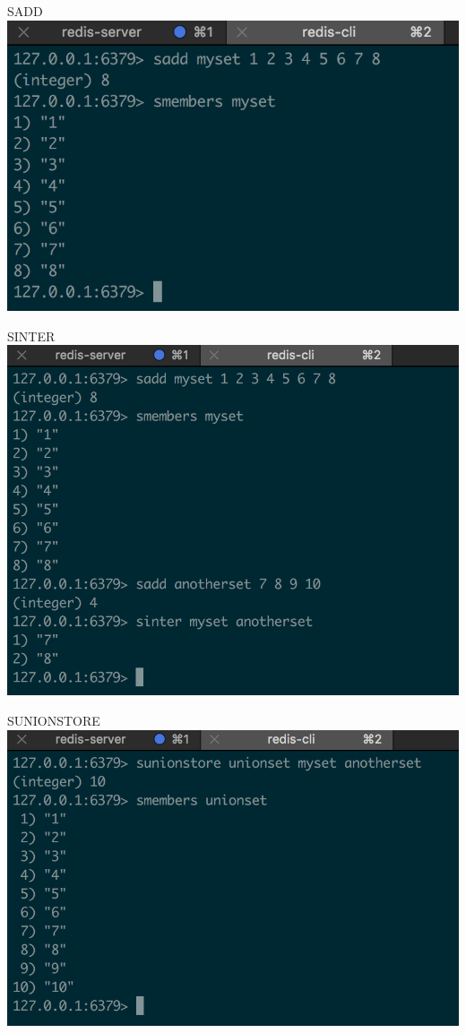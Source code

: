 \documentclass[10pt]{beamer}
\begin{document}
\begin{frame}[fragile]{SADD}
  \includegraphics[scale=0.9]{img/sadd}
\end{frame}

\begin{frame}[fragile]{SINTER}
  \includegraphics[scale=0.7]{img/sinter}
\end{frame}

\begin{frame}[fragile]{SUNIONSTORE}
  \includegraphics[scale=0.7]{img/sunionstore}
\end{frame}
\end{document}
